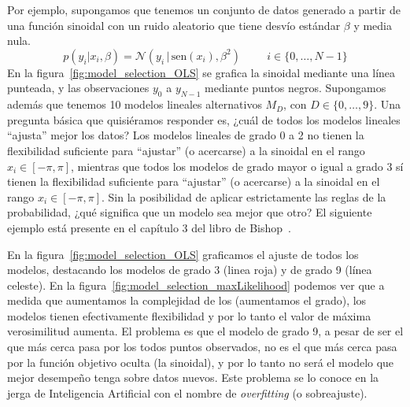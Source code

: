 \documentclass[a4paper,11pt]{book}
\newcommand{\N}{\mathcal{N}}
\theoremstyle{definition}
\begin{document}

Por ejemplo, supongamos que tenemos un conjunto de datos generado a partir de una funci\'on sinoidal con un ruido aleatorio que tiene desv\'io estándar $\beta$ y media nula.
%
\begin{equation*}
p(y_i|x_i,\beta) = \N(y_i \,| \, \text{sen}(x_i), \beta^2)  \hspace{1cm} \text{$i \in \{0,\dots,N-1\}$}
\end{equation*}
%
En la figura~\ref{fig:model_selection_OLS} se grafica la sinoidal mediante una l\'inea punteada, y las observaciones $y_0$ a $y_{N-1}$ mediante puntos negros.
%
Supongamos además que tenemos 10 modelos lineales alternativos $M_D$, con $D \in \{0, \dots, 9\}$.
%
Una pregunta básica que quisiéramos responder es, ¿cuál de todos los modelos lineales ``ajusta'' mejor los datos?
%
Los modelos lineales de grado 0 a 2 no tienen la flexibilidad suficiente para ``ajustar'' (o acercarse) a la sinoidal en el rango $x_i \in [-\pi, \pi]$, mientras que todos los modelos de grado mayor o igual a grado 3 s\'i tienen la flexibilidad suficiente para ``ajustar'' (o acercarse) a la sinoidal en el rango $x_i \in [-\pi, \pi]$.
%
Sin la posibilidad de aplicar estrictamente las reglas de la probabilidad, ¿qué significa que un modelo sea mejor que otro?
%
El siguiente ejemplo está presente en el cap\'itulo 3 del libro de Bishop~\cite{Bishop2006}.

%

En la figura~\ref{fig:model_selection_OLS} graficamos el ajuste de todos los modelos, destacando los modelos de grado 3 (linea roja) y de grado 9 (l\'inea celeste).
%
En la figura~\ref{fig:model_selection_maxLikelihood} podemos ver que a medida que aumentamos la complejidad de los (aumentamos el grado), los modelos tienen efectivamente flexibilidad y por lo tanto el valor de m\'axima verosimilitud aumenta.
%
El problema es que el modelo de grado 9, a pesar de ser el que m\'as cerca pasa por los todos puntos observados, no es el que m\'as cerca pasa por la funci\'on objetivo oculta (la sinoidal), y por lo tanto no ser\'a el modelo que mejor desempe\~no tenga sobre datos nuevos.
%
Este problema se lo conoce en la jerga de Inteligencia Artificial con el nombre de \emph{overfitting} (o sobreajuste).

\end{document}
